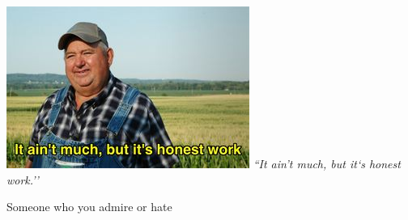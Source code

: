 \documentclass[a4paper, 12pt, twoside, openright]{Thesis}  %
\begin{document}
\frontmatter	           %






\fancyhead{}        %
\rhead{\thepage}    %
\lhead{}            %
\pagestyle{fancy}   %
\clearpage          %

\pagestyle{empty}   %
\null\vfill

\vfill\vfill\vfill\vfill\vfill\vfill\null
\clearpage          %



\pagestyle{empty}  %

\includegraphics{Figures/Honest_Work.jpg}
\null\vfill
\textit{``It ain't much, but it`s honest work.''}
\begin{flushright}
  Someone who you admire or hate
\end{flushright}

\vfill\vfill\vfill\vfill\vfill\vfill\null
\clearpage  %
\end{document}
